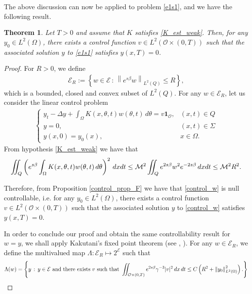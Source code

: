 \documentclass{amsart}    %
\newcommand{\D}{\displaystyle}
\newcommand{\norm}[2]{\left\|#1\right\|_{#2}}
\newcommand{\intd}{\displaystyle\int \kern -7pt \int}
\newtheorem{theorem}{\bf Theorem}[section]
\begin{document}
The above discussion can now be applied to problem \eqref{e1s1}, and we have the following result.

\begin{theorem}\label{control_thm2} 
Let $T>0$ and assume that $K$ satisfies \eqref{K_est_weak}. Then, for any $y_0\in L^2(\Omega)$, there exists a control function $v\in L^2(\mathcal O\times(0,T))$ such that the associated solution $y$ to \eqref{e1s1} satisfies $y(x,T) = 0$.	
\end{theorem}	

\begin{proof}
For $R>0$, we define 
\begin{align*}
	\mathcal E_R:=\left\{ w\in\mathcal E\,:\, \norm{e^{s\beta}w}{L^2(Q)}\leq R\right\},
\end{align*}
which is a bounded, closed and convex subset of $L^2(Q)$. For any $w\in\mathcal E_R$, let us consider the linear control problem 
\begin{align}\label{control_w}
	\begin{cases}
		\D y_t - \Delta y + \int_\Omega K(x,\theta,t)w(\theta,t)\,d\theta = v\mathbf{1}_{\mathcal O}, & (x,t)\in Q
		\\
		y = 0, & (x,t)\in\Sigma
		\\
		y(x,0) = y_0(x), & x\in\Omega.
	\end{cases}
\end{align}	
From hypothesis \eqref{K_est_weak} we have that
\begin{align*}
	\intd_Q\left(e^{s\beta}\int_\Omega K(x,\theta,t)w(\theta,t)\,d\theta\right)^2\,dxdt \leq \mathcal M^2\intd_Q e^{2s\beta}w^2e^{-2s\beta}\,dxdt \leq \mathcal M^2R^2.
\end{align*}

Therefore, from Proposition \ref{control_prop_F} we have that \eqref{control_w} is null controllable, i.e. for any $y_0\in L^2(\Omega)$, there exists a control function $v\in L^2(\mathcal O\times(0,T))$ such that the associated solution $y$ to \eqref{control_w} satisfies $y(x,T) = 0$. 

In order to conclude our proof and obtain the same controllability result for $w=y$, we shall apply Kakutani's fixed point theorem (see \cite[Theorem 2.3]{fernandez2006global}, \cite{kakutani1941generalization}). For any $w\in \mathcal E_R$, we define the multivalued map $\Lambda: \mathcal E_R\mapsto 2^{\mathcal E}$ such that
\begin{align*}
	\Lambda(w) = \left\{y\,:\,y\in\mathcal E \textrm{ and there exists } v \textrm{ such that }	\intd_{\mathcal O\times(0,T)} e^{2s\beta}\gamma^{-3} |v|^2\,dx\,dt \leq C \left(R^2 + \norm{y_0}{L^2(\Omega)}^2\right). \right\}
\end{align*} 	


\end{proof}
\end{document}
